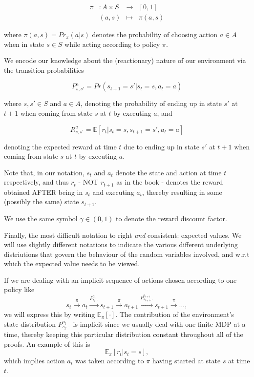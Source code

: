 \documentclass[11pt]{article} %
\begin{document}
\[
	\begin{array}{llll}
		\pi 	& : A \times S 	& \to 	& [0,1] \\
			& (a,s)		& \mapsto	& \pi(a,s)
	\end{array}
\]

where $\pi(a,s) = Pr_{\pi}(a | s)$ denotes the probability of choosing action $a \in A$ when in state $s \in S$ while acting according to policy $\pi$.

We encode our knowledge about the (reactionary) nature of our environment via the transition probabilities

\[
	P_{s,s'}^{a} = Pr(s_{t+1} = s' | s_t = s, a_t = a)
\]
 
where $s,s' \in S$ and $a \in A$, denoting the probability of ending up in state $s'$ at $t+1$ when coming from state $s$ at $t$ by executing $a$, and 

\[
	R_{s,s'}^{a} = \mathbb{E}[r_t | s_t = s, s_{t+1} = s', a_t = a]
\]

denoting the expected reward at time $t$ due to ending up in state $s'$ at $t+1$ when coming from state $s$ at $t$ by executing $a$.

Note that, in our notation, $s_t$ and $a_t$ denote the state and action at time $t$ respectively, and thus $r_t$ - NOT $r_{t+1}$ as in the book - denotes the reward obtained AFTER being in $s_t$ and executing $a_t$, thereby resulting in some (possibly the same) state $s_{t+1}$.

We use the same symbol $\gamma \in (0,1)$ to denote the reward discount factor.

Finally, the most difficult notation to right \textit{and} consistent: expected values. We will use slightly different notations to indicate the various different underlying distriutions that govern the behaviour of the random variables involved, and w.r.t which the expected value needs to be viewed.

If we are dealing with an implicit sequence of actions chosen according to one policy like $$s_t \overset{\pi}{\rightarrow} a_t \overset{P^{a_t}_{s_t,\cdot}}{\rightarrow} s_{t+1} \overset{\pi}{\rightarrow} a_{t+1} \overset{P^{a_{t+1}}_{s_{t+1},\cdot}}{\rightarrow} s_{t+1} \overset{\pi}{\rightarrow} \dots,$$ we will express this by writing $\mathbb{E}_{\pi}[\cdot]$. The contribution of the environment's state distribution $P^{a_t}_{s_t.\cdot}$ is implicit since we usually deal with one finite MDP at a time, thereby keeping this particular distribution constant throughout all of the proofs. An example of this is $$\mathbb{E}_{\pi}[r_t | s_t = s],$$ which implies action $a_t$ was taken according to $\pi$ having started at state $s$ at time $t$.
\end{document}
